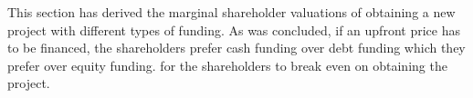\documentclass[main.tex]{subfiles}
\begin{document}
    This section has derived the marginal shareholder valuations of obtaining a new project
    with different types of funding.
    As was concluded, if an upfront price has to be financed,
    the shareholders prefer cash funding over debt funding
    which they prefer over equity funding.
    for the shareholders to break even on obtaining the project.
\end{document}
